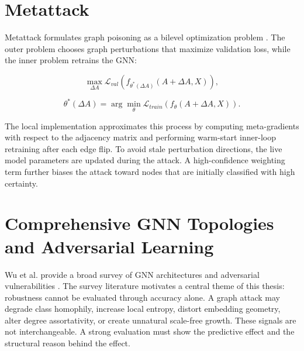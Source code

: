 \documentclass[12pt,oneside]{report}
\begin{document}
\section{Metattack}
Metattack formulates graph poisoning as a bilevel optimization problem \cite{zugner2019metattack}. The outer problem chooses graph perturbations that maximize validation loss, while the inner problem retrains the GNN:

$$
\max_{\Delta A}\mathcal{L}_{val}(f_{\theta^*(\Delta A)}(A+\Delta A,X)),
$$

$$
\theta^*(\Delta A)=\arg\min_{\theta}\mathcal{L}_{train}(f_{\theta}(A+\Delta A,X)).
$$

The local implementation approximates this process by computing meta-gradients with respect to the adjacency matrix and performing warm-start inner-loop retraining after each edge flip. To avoid stale perturbation directions, the live model parameters are updated during the attack. A high-confidence weighting term further biases the attack toward nodes that are initially classified with high certainty.

\section{Comprehensive GNN Topologies and Adversarial Learning}
Wu et al. provide a broad survey of GNN architectures and adversarial vulnerabilities \cite{wu2023survey}. The survey literature motivates a central theme of this thesis: robustness cannot be evaluated through accuracy alone. A graph attack may degrade class homophily, increase local entropy, distort embedding geometry, alter degree assortativity, or create unnatural scale-free growth. These signals are not interchangeable. A strong evaluation must show the predictive effect and the structural reason behind the effect.
\end{document}
